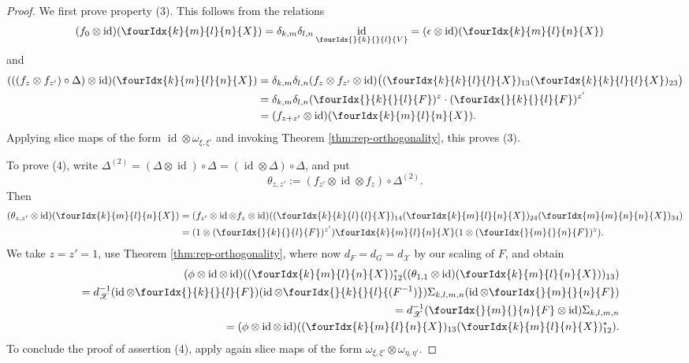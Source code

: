 \documentclass[10pt]{article}
\DeclareMathOperator{\id}{id}
\newcommand{\Gr}[5]{\fourIdx{#2}{#4}{#3}{#5}{#1}}%
\newcommand{\Gru}[3]{\Gr{#1}{}{}{#2}{#3}}
\theoremstyle{definition}
\numberwithin{equation}{section}
\begin{document}
\begin{proof}
    We first prove property (3). This follows from the relations
    \begin{align*}
      (f_{0}  \otimes \id)(\Gr{X}{k}{l}{m}{n}) &=
      \delta_{k,m}\delta_{l,n} \id_{\Gru{V}{k}{l}} =
      (\epsilon \otimes \id)(\Gr{X}{k}{l}{m}{n})
    \end{align*}
    and
    \begin{align*}
      (((f_{z}\otimes f_{z'})\circ \Delta) \otimes
      \id)(\Gr{X}{k}{l}{m}{n}) &=  \delta_{k,m}\delta_{l,n}(f_{z} \otimes f_{z'} \otimes
      \id)\big((\Gr{X}{k}{l}{k}{l})_{13}
      (\Gr{X}{k}{l}{k}{l})_{23}\big) \\
      &=  \delta_{k,m}\delta_{l,n}(\Gru{F}{k}{l})^{z}  \cdot (\Gru{F}{k}{l})^{z'} \\
      &= (f_{z+z'} \otimes \id)(\Gr{X}{k}{l}{m}{n}).
    \end{align*}
    Applying slice maps of the form $\id
    \otimes \omega_{\xi,\xi'}$ and invoking Theorem \ref{thm:rep-orthogonality}, this proves (3).

To prove (4), write $ \Delta^{(2)} = (
    \Delta \otimes \id)\circ  \Delta = (\id \otimes 
    \Delta) \circ \Delta$, and put \[\theta_{z,z'}:=(f_{z'} \otimes \id
    \otimes f_{z})\circ  \Delta^{(2)}.\] Then
    \begin{align*}
      (\theta_{z,z'} \otimes \id)(\Gr{X}{k}{l}{m}{n}) &= (f_{z'} \otimes
      \id \otimes f_{z} \otimes
      \id)((\Gr{X}{k}{l}{k}{l})_{14}(\Gr{X}{k}{l}{m}{n})_{24}(\Gr{X}{m}{n}{m}{n})_{34})
      \\
      &= (1 \otimes (\Gru{F}{k}{l})^{z'}) \Gr{X}{k}{l}{m}{n} (1
      \otimes (\Gru{F}{m}{n})^{z}).
    \end{align*}
    We take $z=z'=1$, use Theorem \ref{thm:rep-orthogonality}, where
    now $d_F= d_G=d_{\mathscr{X}}$ by our scaling of $F$, and obtain
    \begin{eqnarray*}
     && \hspace{-2cm} (\phi \otimes \id \otimes
      \id)((\Gr{X}{k}{l}{m}{n})_{12}^{*}((\theta_{1,1} \otimes
      \id)(\Gr{X}{k}{l}{m}{n}))_{13})\\ && =d_{\mathscr{X}}^{-1}(\id \otimes
      \Gru{F}{k}{l}) (\id \otimes \Gru{(F^{-1})}{k}{l})
      \Sigma_{k,l,m,n} (\id \otimes
      \Gru{F}{m}{n}) \\
      &&=d_{\mathscr{X}}^{-1}(\Gru{F}{m}{n} \otimes \id) \Sigma_{k,l,m,n} \\
      &&= (\phi \otimes \id \otimes
      \id)((\Gr{X}{k}{l}{m}{n})_{13}(\Gr{X}{k}{l}{m}{n})_{12}^{*}).
    \end{eqnarray*}
    To conclude the proof of assertion (4), apply again slice maps of the form
    $\omega_{\xi,\xi'} \otimes \omega_{\eta,\eta'}$.


\end{proof}
\end{document}

